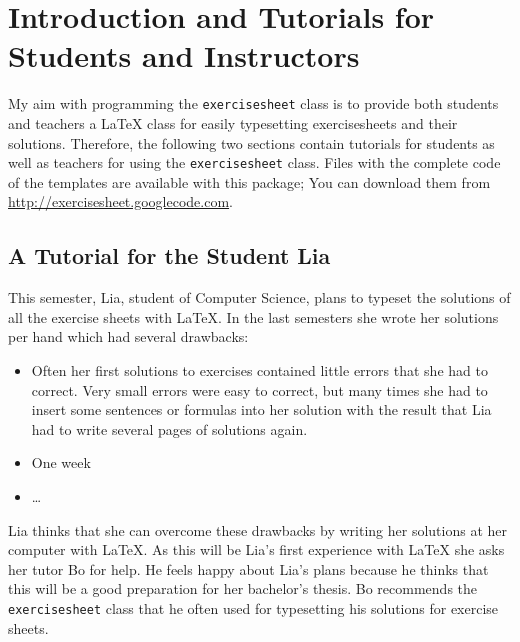 \documentclass{report}
\def\exercisesheet{\texttt{exercisesheet}}
\begin{document}

\begin{abstract}
  The \exercisesheet{} class provides a convenient way to produce
  hiqh-quality exercise sheets for both students and instructors. This
  is the official reference manual. It contains tutorials for students
  and instructors that explain the first steps in using this class.
  Moreover, a complete list of the commands defined by the
  \exercisesheet{} class is contained.
\end{abstract}

\tableofcontents

\chapter{Introduction and Tutorials for Students and Instructors}

My aim with programming the \exercisesheet{} class is to provide both
students and teachers a \LaTeX{} class for easily typesetting
exercisesheets and their solutions. Therefore, the following two
sections contain tutorials for students as well as teachers for using
the \exercisesheet{} class. Files with the complete code of the
templates are available with this package; You can download them from
\url{http://exercisesheet.googlecode.com}.

\section{A Tutorial for the Student Lia}

This semester, Lia, student of Computer Science, plans to typeset the
solutions of all the exercise sheets with \LaTeX{}. In the last
semesters she wrote her solutions per hand which had several
drawbacks:
\begin{itemize}
  \item Often her first solutions to exercises contained little errors
    that she had to correct. Very small errors were easy to correct,
    but many times she had to insert some sentences or formulas into
    her solution with the result that Lia had to write several pages
    of solutions again.
  \item One week 
  \item \ldots
\end{itemize}
Lia thinks that she can overcome these drawbacks by writing her
solutions at her computer with \LaTeX. As this will be Lia's first
experience with \LaTeX{} she asks her tutor Bo for help. He feels
happy about Lia's plans because he thinks that this will be a good
preparation for her bachelor's thesis. Bo recommends the
\exercisesheet{} class that he often used for typesetting his
solutions for exercise sheets.
\end{document}
